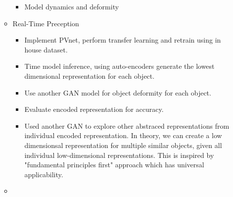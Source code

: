 \documentclass[11pt]{article}
\begin{document}
\begin{itemize}
\begin{itemize}
\begin{itemize}
            \item Model dynamics and deformity
      \end{itemize}
      \item Real-Time Preception
      \begin{itemize}
        \item Implement PVnet, perform transfer learning and retrain using
        in house dataset.
        \item Time model inference, using auto-encoders generate the lowest
        dimensional representation for each object.
        \item Use another GAN model for object deformity for each object.
        \item Evaluate encoded representation for accuracy.
        \item Used another GAN to explore other abstraced representations from
        individual encoded representation. In theory, we can create a low
        dimensionsal representation for multiple similar objects, given all
        individual low-dimensional representations. This is inspired by "fundamental
        principles first" approach which has universal applicability.
      \end{itemize}
      \item
  \end{itemize}
\end{itemize}
\end{document}
